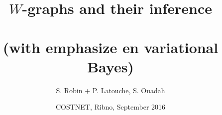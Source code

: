 \documentclass[10pt]{beamer}
\newcommand{\fignet}{../FIGURES}
\begin{document}

\title[$W$-graphs and their inference]{$W$-graphs and their inference \\ ~\\
  \normalsize{(with emphasize en variational Bayes)}}

\author[S. Robin]{S. Robin + P. Latouche, S. Ouadah}


\date[COSTNET, Sept.'16]{COSTNET, Ribno, September 2016}

\maketitle

\end{document}

